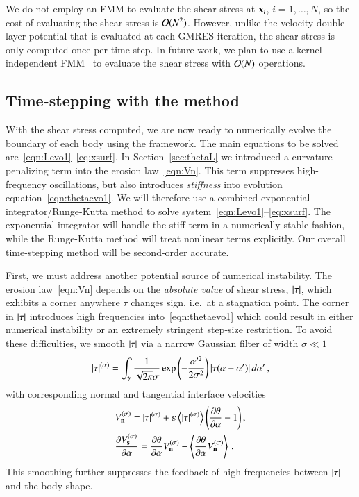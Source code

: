 \documentclass[preprint, 10pt]{elsarticle}
\begin{document}
We do not employ an FMM to evaluate the shear stress at ${\mathbf{x}}_i$, $i=1,\ldots,N$, so the cost of evaluating the shear stress is ${\mathcal{O}}(N^2)$.  However, unlike the velocity double-layer potential that is evaluated at each GMRES iteration, the shear stress is only computed once per time step. In future work, we plan to use a kernel-independent FMM~\cite{yin-bir-zor2004} to evaluate the shear stress with ${\mathcal{O}}(N)$ operations.  


\subsection{Time-stepping with the {\thL} method} 
\label{sec:timeStepping}

With the shear stress computed, we are now ready to numerically evolve the boundary of each body using the {\thL} framework. The main equations to be solved are~\eqref{eqn:Levo1}--\eqref{eq:xsurf}.  In Section~\ref{sec:thetaL} we introduced a curvature-penalizing term into the erosion law~\eqref{eqn:Vn}. This term suppresses high-frequency oscillations, but also introduces {\em stiffness} into evolution equation~\eqref{eqn:thetaevo1}. We will therefore use a combined exponential-integrator/Runge-Kutta method to solve system~\eqref{eqn:Levo1}--\eqref{eq:xsurf}. The exponential integrator will handle the stiff term in a numerically stable fashion, while the Runge-Kutta method will treat nonlinear terms explicitly. Our overall time-stepping method will be second-order accurate.

First, we must address another potential source of numerical instability. The erosion law~\eqref{eqn:Vn} depends on the {\em absolute value} of shear stress, $\lvert \tau \rvert$, which exhibits a corner anywhere $\tau$ changes sign, i.e.~at a stagnation point. The corner in $\lvert \tau \rvert$ introduces high frequencies into~\eqref{eqn:thetaevo1} which could result in either numerical instability or an extremely stringent step-size restriction. To avoid these difficulties, we smooth $\lvert \tau \rvert$ via a narrow Gaussian filter of width $\sigma \ll 1$
\begin{align}
\lvert \tau \rvert^{(\sigma)} = \int_{\gamma} \frac{1}{\sqrt{2\pi} \sigma}
 \exp \left(- \frac{\alpha'^2}{2 \sigma^2}\right) \lvert  \tau(\alpha - \alpha')  \rvert \, d\alpha' \, ,
\end{align}
with corresponding normal and tangential interface velocities
\begin{align}
& V_{\mathbf{n}}^{(\sigma)} = \lvert \tau \rvert^{(\sigma)} +  \varepsilon \left< \lvert \tau \rvert^{(\sigma)} \right>
\left(\frac{\partial \theta}{\partial \alpha} - 1 \right), \\
& \frac{\partial V_{\mathbf{s}}^{(\sigma)}}{\partial \alpha} = \frac{\partial \theta}{\partial \alpha} V_{\mathbf{n}}^{(\sigma)} - \left< \frac{\partial \theta}{\partial \alpha} V_{\mathbf{n}}^{(\sigma)} \right> \, .
\end{align}
This smoothing further suppresses the feedback of high frequencies between $\lvert \tau \rvert$ and the body shape.
\end{document}
